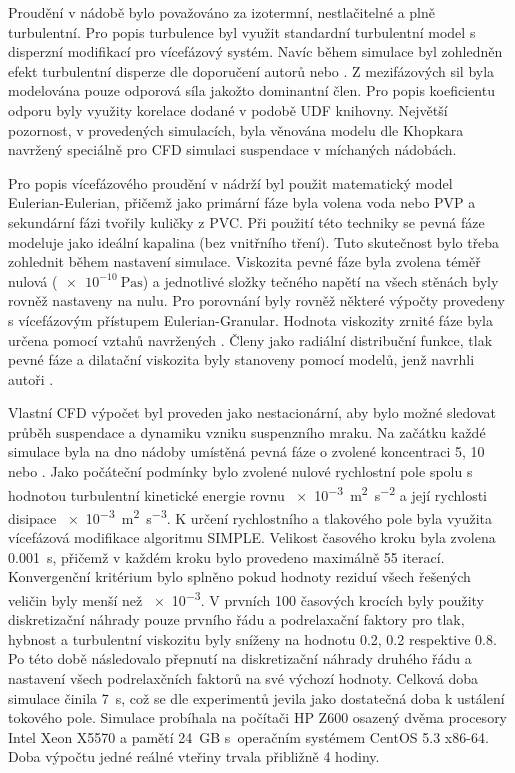 Proudění v nádobě bylo považováno za izotermní, nestlačitelné a plně turbulentní. Pro popis turbulence byl využit standardní \keps{} turbulentní model s disperzní modifikací pro vícefázový systém. Navíc během simulace byl zohledněn efekt turbulentní disperze dle doporučení autorů \citet{lju01} nebo \citet{tamb09}. Z mezifázových sil byla modelována pouze odporová síla jakožto dominantní člen. Pro popis koeficientu odporu byly využity korelace dodané v podobě UDF knihovny. Největší pozornost, v provedených simulacích, byla věnována modelu dle Khopkara navržený speciálně pro CFD simulaci suspendace v míchaných nádobách.

Pro popis vícefázového proudění v nádrží byl použit matematický model Eulerian-Eulerian, přičemž jako primární fáze byla volena voda nebo PVP a sekundární fázi tvořily kuličky z PVC. Při použití této techniky se pevná fáze modeluje jako ideální kapalina (bez vnitřního tření). Tuto skutečnost bylo třeba zohlednit během nastavení simulace. Viskozita pevné fáze byla zvolena téměř nulová ($\SI{e-10}{\pascal\second}$) a jednotlivé složky tečného napětí na všech stěnách byly rovněž nastaveny na nulu. Pro porovnání byly rovněž některé výpočty provedeny s vícefázovým přístupem Eulerian-Granular. Hodnota viskozity zrnité fáze byla určena pomocí vztahů navržených \citet{syam93}. Členy jako radiální distribuční funkce, tlak pevné fáze a dilatační viskozita byly stanoveny pomocí modelů, jenž navrhli autoři \citet{lun84}.  

Vlastní CFD výpočet byl proveden jako nestacionární, aby bylo možné sledovat průběh suspendace a dynamiku vzniku suspenzního mraku. Na začátku každé simulace byla na dno nádoby umístěná pevná fáze o zvolené koncentraci 5, 10 nebo . Jako počáteční podmínky bylo zvolené nulové rychlostní pole spolu s hodnotou turbulentní kinetické energie rovnu \SI{e-3}{\meter\squared\per\second\squared} a její rychlosti disipace \SI{e-3}{\meter\squared\per\second\cubed}. K určení rychlostního a tlakového pole byla využita vícefázová modifikace algoritmu SIMPLE. Velikost časového kroku byla zvolena \SI{0.001}{\second}, přičemž v každém kroku bylo provedeno maximálně \num{55} iterací. Konvergenční kritérium bylo splněno pokud hodnoty reziduí všech řešených veličin byly menší než \num{e-3}. V prvních \num{100} časových krocích byly použity diskretizační náhrady pouze prvního řádu a podrelaxační faktory pro tlak, hybnost a turbulentní viskozitu byly sníženy na hodnotu \num{0.2}, \num{0.2} respektive \num{0.8}. Po této době následovalo přepnutí na diskretizační náhrady druhého řádu a nastavení všech podrelaxčních faktorů na své výchozí hodnoty. Celková doba simulace činila \SI{7}{\second}, což se dle experimentů jevila jako dostatečná doba k ustálení tokového pole. Simulace probíhala na počítači HP Z600 osazený dvěma procesory Intel Xeon X5570 a pamětí 24~GB s~operačním systémem CentOS 5.3 x86-64. Doba výpočtu jedné reálné vteřiny trvala přibližně 4 hodiny.


